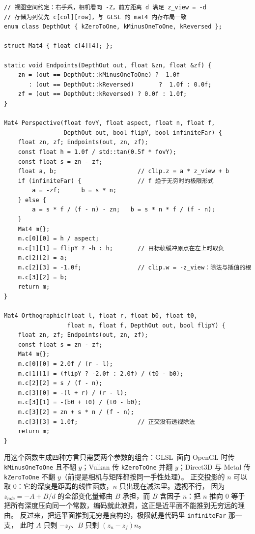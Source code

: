 \documentclass[12pt,a4paper,fontset=fandol]{ctexbook}
\newcommand{\Tp}[1]{\texttt{#1}}
\newcommand{\Lang}[1]{\textsf{#1}}
\newcommand{\GSL}{\Lang{GLSL}}
\begin{document}
\begin{lstlisting}[style=cppstyle,caption={透视与正交矩阵生成：一次覆盖深度范围、Y 翻转、reverse-Z 与无穷远平面四个约定},label={lst:ch04-matrix-gen}]
// 视图空间约定：右手系，相机看向 -Z，前方距离 d 满足 z_view = -d
// 存储为列优先 c[col][row]，与 GLSL 的 mat4 内存布局一致
enum class DepthOut { kZeroToOne, kMinusOneToOne, kReversed };

struct Mat4 { float c[4][4]; };

static void Endpoints(DepthOut out, float &zn, float &zf) {
    zn = (out == DepthOut::kMinusOneToOne) ? -1.0f
       : (out == DepthOut::kReversed)       ?  1.0f : 0.0f;
    zf = (out == DepthOut::kReversed) ? 0.0f : 1.0f;
}

Mat4 Perspective(float fovY, float aspect, float n, float f,
                 DepthOut out, bool flipY, bool infiniteFar) {
    float zn, zf; Endpoints(out, zn, zf);
    const float h = 1.0f / std::tan(0.5f * fovY);
    const float s = zn - zf;
    float a, b;                       // clip.z = a * z_view + b
    if (infiniteFar) {                // f 趋于无穷时的极限形式
        a = -zf;      b = s * n;
    } else {
        a = s * f / (f - n) - zn;   b = s * n * f / (f - n);
    }
    Mat4 m{};
    m.c[0][0] = h / aspect;
    m.c[1][1] = flipY ? -h : h;       // 目标帧缓冲原点在左上时取负
    m.c[2][2] = a;
    m.c[2][3] = -1.0f;                // clip.w = -z_view：除法与插值的根
    m.c[3][2] = b;
    return m;
}

Mat4 Orthographic(float l, float r, float b0, float t0,
                  float n, float f, DepthOut out, bool flipY) {
    float zn, zf; Endpoints(out, zn, zf);
    const float s = zn - zf;
    Mat4 m{};
    m.c[0][0] = 2.0f / (r - l);
    m.c[1][1] = (flipY ? -2.0f : 2.0f) / (t0 - b0);
    m.c[2][2] = s / (f - n);
    m.c[3][0] = -(l + r) / (r - l);
    m.c[3][1] = -(b0 + t0) / (t0 - b0);
    m.c[3][2] = zn + s * n / (f - n);
    m.c[3][3] = 1.0f;                 // 正交没有透视除法
    return m;
}
\end{lstlisting}

用这个函数生成四种方言只需要两个参数的组合：\GSL\ 面向 OpenGL 时传
\Tp{kMinusOneToOne} 且不翻 $y$；Vulkan 传 \Tp{kZeroToOne} 并翻 $y$；Direct3D 与 Metal
传 \Tp{kZeroToOne} 不翻 $y$（前提是相机与矩阵都按同一手性处理）。
正交投影的 $n$ 可以取 $0$：它的深度是距离的线性函数，$n$ 只出现在减法里。透视不行，
因为 $z_{ndc} = -A + B/d$ 的全部变化量都由 $B$ 承担，而 $B$ 含因子 $n$：把 $n$ 推向 $0$
等于把所有深度压向同一个常数，编码就此浪费，这正是近平面不能推到无穷远的理由。
反过来，把远平面推到无穷是良构的，极限就是代码里 \Tp{infiniteFar} 那一支，
此时 $A$ 只剩 $-z_f$、$B$ 只剩 $(z_n - z_f) n$。
\end{document}
